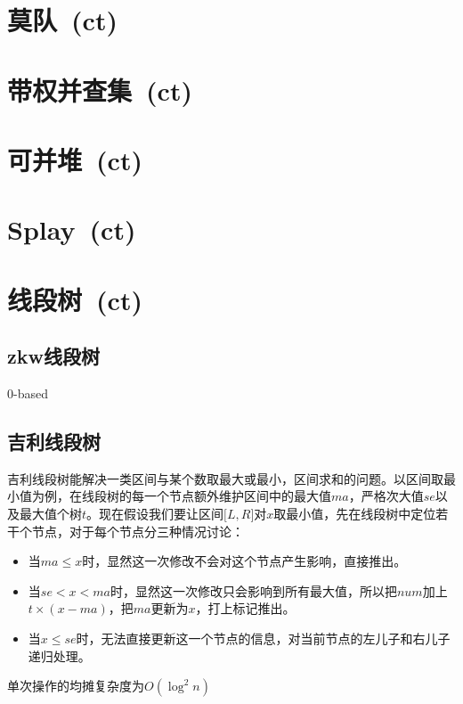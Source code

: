 \section{莫队\ \small(ct)}
\section{带权并查集\ \small(ct)}
\section{可并堆\ \small(ct)}
\section{Splay\ \small(ct)}
\section{线段树\ \small(ct)}
	\subsection*{zkw线段树}
		$ 0 $-based
	\subsection*{吉利线段树}
		吉利线段树能解决一类区间与某个数取最大或最小，区间求和的问题。以区间取最小值为例，在线段树的每一个节点额外维护区间中的最大值$ ma $，严格次大值$ se $以及最大值个树$ t $。现在假设我们要让区间$ \lbrack L, R \rbrack $对$ x $取最小值，先在线段树中定位若干个节点，对于每个节点分三种情况讨论：
		\begin{itemize}[nosep,wide=0pt]
			\item 当$ ma \leq x $时，显然这一次修改不会对这个节点产生影响，直接推出。
			\item 当$ se < x < ma $时，显然这一次修改只会影响到所有最大值，所以把$ num $加上$ t \times (x - ma) $，把$ ma $更新为$ x $，打上标记推出。
			\item 当$ x \leq se $时，无法直接更新这一个节点的信息，对当前节点的左儿子和右儿子递归处理。
		\end{itemize}
		单次操作的均摊复杂度为$ O(\log^2 n) $
